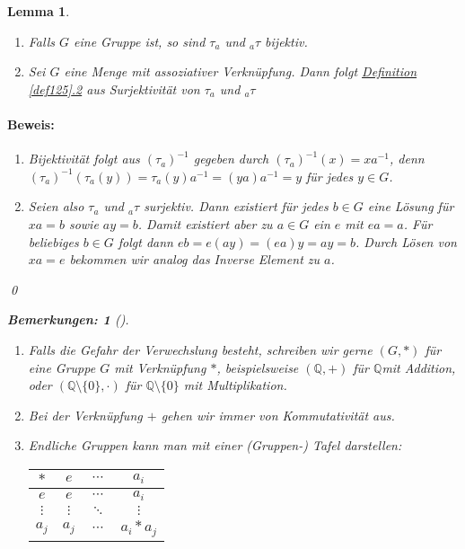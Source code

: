 \documentclass{report}
\newcommand{\Q}{\mathbb{Q}}
\newcommand{\mQ}{$\mathbb{Q}$}
\theoremstyle{customrem}
\newtheorem*{bemerkung2}{Bemerkungen\textnormal:}
\newenvironment{bemerkungen}[1][]{\begin{bemerkung2}[#1]\leavevmode}{\end{bemerkung2}}
\theoremstyle{customdef}
\newtheorem{lemma}[definition]{Lemma}
\renewenvironment{proof}{\paragraph{Beweis: }}{\qed}
\begin{document}
	\begin{lemma}$ $\vspace{-.75cm}
		\label{lem128}
		\begin{enumerate}
			\item Falls $G$ eine Gruppe ist, so sind $\tau_a$ und $_{a}\tau$ bijektiv.
			\item Sei $G$ eine Menge mit assoziativer Verknüpfung. Dann folgt \hyperref[def125]{Definition \ref*{def125}.2} aus Surjektivität von $\tau_a$ und $_{a}\tau$
		\end{enumerate}
		\vspace{.25cm}
		\begin{proof}
			\begin{enumerate}
				\item Bijektivität folgt aus  $(\tau_a)^{-1}$ gegeben durch $(\tau_a)^{-1}(x) = x a^{-1}$, denn $(\tau_a)^{-1}(\tau_a(y)) = \tau_a(y)a^{-1} = (y a) a^{-1} = y$ für jedes $y \in G$.
				\item Seien also $\tau_a$ und $_{a}\tau$ surjektiv. Dann existiert für jedes $b \in G$ eine Lösung für 
				$x a = b$ sowie $a y = b$. 
				Damit existiert aber zu $a \in G$ ein  $e$ mit $ea = a$. Für beliebiges $b \in G$ folgt dann $e b = e (a y) = (e a) y = ay = b$.	Durch Lösen von $x a = e$ bekommen wir analog das Inverse Element zu $a$.
			\end{enumerate}
		\end{proof}
		\vspace{.25cm}
		\begin{bemerkungen}
			\begin{enumerate}
				\item Falls die Gefahr der Verwechslung besteht, schreiben wir gerne $(G, \ast)$ für eine Gruppe $G$ mit Verknüpfung $\ast$, 
				beispielsweise $(\Q, +)$ für \mQ mit Addition, oder $(\Q \setminus \{0\}, \cdot)$ für $\Q \setminus \{0\}$ mit Multiplikation.
				\item Bei der Verknüpfung $+$ gehen wir immer von Kommutativität aus.
				\item Endliche Gruppen kann man mit einer (Gruppen-) Tafel darstellen:
				\begin{center}
					\begin{tabular}{c || c  c  c}
						$\ast$   & $e$      & $\cdots$ & $a_i$	    \\\hline\hline
						$e$      & $e$      & $\cdots$	& $a_i$     \\
						$\vdots$ & $\vdots$ & $\ddots$	& $\vdots$  \\
						$a_j$ 	 &$a_j$     & $\cdots$	& $a_i * a_j$

\end{tabular}
\end{center}
\end{enumerate}
\end{bemerkungen}
\end{lemma}
\end{document}
